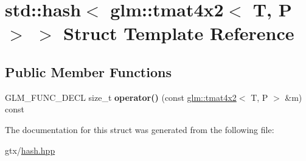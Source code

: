 \hypertarget{structstd_1_1hash_3_01glm_1_1tmat4x2_3_01T_00_01P_01_4_01_4}{\section{std\-:\-:hash$<$ glm\-:\-:tmat4x2$<$ T, P $>$ $>$ Struct Template Reference}
\label{structstd_1_1hash_3_01glm_1_1tmat4x2_3_01T_00_01P_01_4_01_4}
}
\subsection*{Public Member Functions}
\begin{DoxyCompactItemize}
\item 
\hypertarget{structstd_1_1hash_3_01glm_1_1tmat4x2_3_01T_00_01P_01_4_01_4_a0f9e508f5c832a3d9d89dd04010d623c}{G\-L\-M\-\_\-\-F\-U\-N\-C\-\_\-\-D\-E\-C\-L size\-\_\-t {\bfseries operator()} (const \hyperlink{structglm_1_1tmat4x2}{glm\-::tmat4x2}$<$ T, P $>$ \&m) const }\label{structstd_1_1hash_3_01glm_1_1tmat4x2_3_01T_00_01P_01_4_01_4_a0f9e508f5c832a3d9d89dd04010d623c}

\end{DoxyCompactItemize}


The documentation for this struct was generated from the following file\-:\begin{DoxyCompactItemize}
\item 
gtx/\hyperlink{hash_8hpp}{hash.\-hpp}\end{DoxyCompactItemize}
